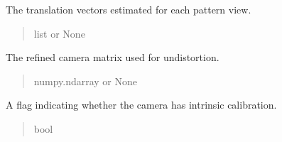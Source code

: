 \documentclass[letterpaper,10pt,english]{sphinxmanual}
\begin{document}
\begin{fulllineitems}

\begin{fulllineitems}
\label{\detokenize{CameraUtils:CameraUtils.Camera.tvecs}}
\pysigstartsignatures
{}
\pysigstopsignatures
\sphinxAtStartPar
The translation vectors estimated for each pattern view.
\begin{quote}\begin{description}
\sphinxAtStartPar
list or None

\end{description}\end{quote}

\end{fulllineitems}


\begin{fulllineitems}
\label{\detokenize{CameraUtils:CameraUtils.Camera.new_mtx}}
\pysigstartsignatures
{}
\pysigstopsignatures
\sphinxAtStartPar
The refined camera matrix used for undistortion.
\begin{quote}\begin{description}
\sphinxAtStartPar
numpy.ndarray or None

\end{description}\end{quote}

\end{fulllineitems}


\begin{fulllineitems}
\label{\detokenize{CameraUtils:CameraUtils.Camera.INT_CAL}}
\pysigstartsignatures
{}
\pysigstopsignatures
\sphinxAtStartPar
A flag indicating whether the camera has intrinsic calibration.
\begin{quote}\begin{description}
\sphinxAtStartPar
bool

\end{description}\end{quote}


\end{fulllineitems}
\end{fulllineitems}
\end{document}
